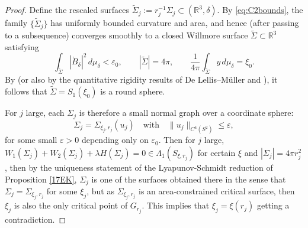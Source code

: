 \documentclass[12pt,a4paper]{amsart}
\theoremstyle{plain}
\theoremstyle{definition}
\begin{document}
\begin{proof}
Define the rescaled surfaces $\tilde{\Sigma}_j := r_j^{-1}\Sigma_j 
\subset (\mathbb{R}^{3}, \delta)$.
By \eqref{eq:C2bounds}, the family $\{\tilde{\Sigma}_j\}$ has uniformly 
bounded curvature and area, and hence (after passing to a subsequence) converges 
smoothly to a closed Willmore surface 
$\tilde{\Sigma} \subset \mathbb{R}^{3}$ satisfying
\[
  \int_{\tilde{\Sigma}} |\mathring{B}_{\delta}|^{2}\, d\mu_{\delta} 
  < \varepsilon_0, 
  \qquad |\tilde{\Sigma}| = 4\pi, 
  \qquad \frac{1}{4\pi} \int_{\tilde{\Sigma}} y\, d\mu_{\delta} = \xi_0.
\]
By  \cite[Theorem 2.7]{kuwert2001willmore}  (or also by the quantitative rigidity results of De Lellis–Müller \cite[Theorem 1]{de2005optimal} and \cite[Theorem 2]{de2006ac}), it follows that $\tilde{\Sigma}=S_{1}(\xi_0)$ is a round sphere.


For $j$ large, each $\Sigma_j$ is therefore a small normal graph over a 
coordinate sphere:
\[
  \Sigma_j = \Sigma_{\xi_j, r_j}(u_j)
  \quad\text{with}\quad 
  \|u_j\|_{C^{4}(S^{2})} \le \varepsilon,
\]
for some small $\varepsilon>0$ depending only on $\varepsilon_0$. Then for $j$ large,  $W_1(\Sigma_j) + W_2(\Sigma_j)+ \lambda H(\Sigma_j) =0\in \Lambda_1(S_{\xi,r_{j}})$ for certain $\xi$ and $|\Sigma_j|= 4\pi r_j^2$, then by the uniqueness statement of the Lyapunov-Schmidt reduction of Proposition \ref{17EK}, $\Sigma_j $ is one of the surfaces obtained there in the sense that  \(\Sigma_j = \Sigma_{\xi_j, r_j}\) for some \(\xi_j\), but as $\Sigma_{\xi_j, r_j} $ is an area-constrained critical surface, then $\xi_j$ is also the only critical point of \(G_{r_j}\). This implies that $ \xi_j =\xi(r_j)$ getting a contradiction.
\end{proof}
\end{document}
